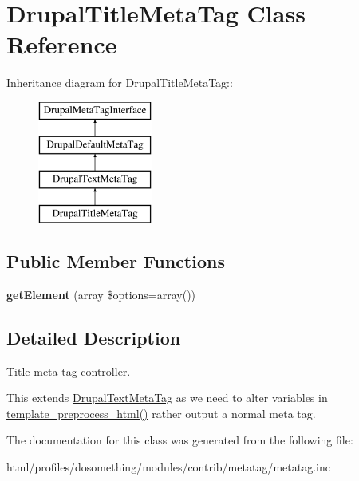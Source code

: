 \hypertarget{classDrupalTitleMetaTag}{
\section{DrupalTitleMetaTag Class Reference}
\label{classDrupalTitleMetaTag}
}
Inheritance diagram for DrupalTitleMetaTag::\begin{figure}[H]
\begin{center}
\leavevmode
\includegraphics[height=4cm]{classDrupalTitleMetaTag}
\end{center}
\end{figure}
\subsection*{Public Member Functions}
\begin{DoxyCompactItemize}
\item 
\hypertarget{classDrupalTitleMetaTag_a319f36b2164ca9b3c2997c974da70da8}{
{\bfseries getElement} (array \$options=array())}
\label{classDrupalTitleMetaTag_a319f36b2164ca9b3c2997c974da70da8}

\end{DoxyCompactItemize}


\subsection{Detailed Description}
Title meta tag controller.

This extends \hyperlink{classDrupalTextMetaTag}{DrupalTextMetaTag} as we need to alter variables in \hyperlink{includes_2theme_8inc_a5bc9f37111330a160833274482ad866a}{template\_\-preprocess\_\-html()} rather output a normal meta tag. 

The documentation for this class was generated from the following file:\begin{DoxyCompactItemize}
\item 
html/profiles/dosomething/modules/contrib/metatag/metatag.inc\end{DoxyCompactItemize}
